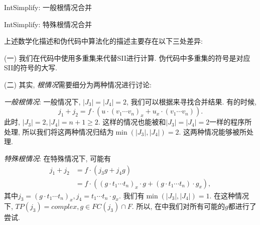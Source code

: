 \begin{algorithm}
\caption{IntSimplify: 一般根情况合并}
\label{FindRuleForVars2}
\end{algorithm}

\begin{algorithm}
\caption{IntSimplify: 特殊根情况合并}
\label{FindRuleForVars1}
\end{algorithm}

上述数学化描述和伪代码中算法化的描述主要存在以下三处差异:

(一) 我们在代码中使用多重集来代替SII进行计算. 伪代码中多重集的符号是对应SII的符号的大写.

(二) 其实, \emph{根情况}需要细分为两种情况进行讨论:
\begin{asparaenum}[(i)]
\item \emph{一般根情况}: 一般情况下, $|J_3|=|J_4|=2$, 我们可以根据来寻找合并结果. 有的时候, 
\begin{equation}
j_1+j_2 = f \cdot ( u \cdot (v_1 \cdots v_n)_x +  u_x \cdot (v_1 \cdots v_n ) ).
\end{equation}
此时, $|J_3|=2,|J_4|=n+1\ge 2$. 这样的情况也能被和$|J_3|=|J_4|=2$一样的程序所处理, 所以我们将这两种情况归结为$\min(|J_3|,|J_4|)=2$. 这两种情况能够被所处理.
\item \emph{特殊根情况}: 在特殊情况下, 可能有
\begin{equation}
\begin{split}
j_1 + j_2   &= f \cdot ( j_3 g + j_4 g ) \\ 
            &= f \cdot ( (g \cdot t_1\cdots t_n)_x\cdot g + (g \cdot t_1\cdots t_n)\cdot g_x ),
\end{split}
\end{equation}
其中$j_3=(g \cdot t_1\cdots t_n)_x , j_4=t_1\cdots t_n\cdot g_x$. 我们有$\min(|J_3|,|J_4|)=1$. 在这种情况下, $TP(j_3)=complex, g\in FC(j_3)\cap F$. 所以, 在中我们对所有可能的$g$都进行了尝试. 
\end{asparaenum}


